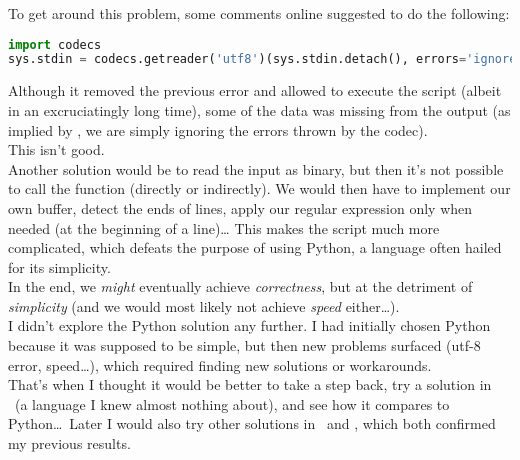 To get around this problem, some comments online suggested to do the following:

\begin{lstlisting}[language=python]
import codecs
sys.stdin = codecs.getreader('utf8')(sys.stdin.detach(), errors='ignore')
\end{lstlisting}


Although it removed the previous error and allowed to execute the script (albeit in an excruciatingly long time), some of the data was missing from the output (as implied by , we are simply ignoring the errors thrown by the  codec). \\

This isn't good. \\

Another solution would be to read the input as binary, but then it's not possible to call the  function (directly or indirectly). We would then have to implement our own buffer, detect the ends of lines, apply our regular expression only when needed (at the beginning of a line)\dots 
This makes the script much more complicated, which defeats the purpose of using Python, a language often hailed for its simplicity. \\

In the end, we \emph{might} eventually achieve \emph{correctness}, but at the detriment of \emph{simplicity} (and we would most likely not achieve \emph{speed} either\dots). \\

I didn't explore the Python solution any further. I had initially chosen Python because it was supposed to be simple, but then new problems surfaced (utf-8 error, speed\dots), which required finding new solutions or workarounds. \\

That's when I thought it would be better to take a step back, try a solution in \awk\ (a language I knew almost nothing about), and see how it compares to Python\dots\ Later I would also try other solutions in \perl\ and \julia, which both confirmed my previous results.


